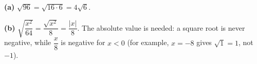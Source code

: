 \textbf{(a)} $\sqrt{96}=\sqrt{16\cdot6}=\boxed{4\sqrt6}$.

\textbf{(b)} $\sqrt{\dfrac{x^2}{64}}=\dfrac{\sqrt{x^2}}{8}=\boxed{\dfrac{|x|}{8}}$. The absolute value is needed: a square root is never negative, while $\dfrac x8$ is negative for $x<0$ (for example, $x=-8$ gives $\sqrt1=1$, not $-1$).
